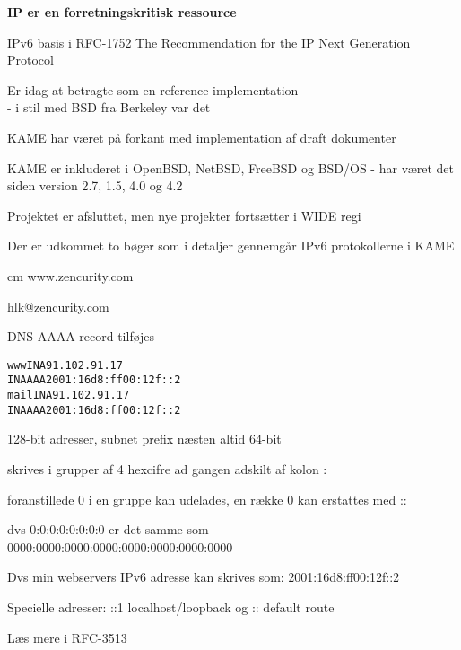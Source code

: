 \documentclass[Screen16to9,17pt]{foils}
\begin{document}
\centerline{\bf IP er en forretningskritisk ressource}

IPv6 basis i RFC-1752 The Recommendation for the IP Next Generation Protocol



\centerline{}

\begin{list2}
\item Er idag at betragte som en reference implementation\\
- i stil med BSD fra Berkeley var det
\item KAME har været på forkant med implementation af draft dokumenter
\item KAME er inkluderet i OpenBSD, NetBSD, FreeBSD og BSD/OS
- har været det siden version 2.7, 1.5, 4.0 og 4.2

\item Projektet er afsluttet, men nye projekter fortsætter i
WIDE regi 
\item Der er udkommet to bøger som i detaljer gennemgår IPv6 protokollerne i KAME
\end{list2}


\begin{center}
\hlkbig
{} cm
www.zencurity.com

hlk@zencurity.com

\end{center}

\pause
DNS AAAA record tilføjes

\begin{alltt}
www     IN A    91.102.91.17
        IN AAAA 2001:16d8:ff00:12f::2
mail    IN A    91.102.91.17
        IN AAAA 2001:16d8:ff00:12f::2
\end{alltt}



\begin{list2}
\item 128-bit adresser, subnet prefix næsten altid 64-bit
\item skrives i grupper af 4 hexcifre ad gangen adskilt af kolon :
\item foranstillede 0 i en gruppe kan udelades, en række 0 kan erstattes med ::
\item dvs 0:0:0:0:0:0:0:0 er det samme som \\
0000:0000:0000:0000:0000:0000:0000:0000
\item Dvs min webservers IPv6 adresse kan skrives som:
2001:16d8:ff00:12f::2
\item Specielle adresser:
::1 localhost/loopback og
::  default route
\item Læs mere i RFC-3513
\end{list2}
\end{document}
